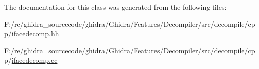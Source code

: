 The documentation for this class was generated from the following files\+:\begin{DoxyCompactItemize}
\item 
F\+:/re/ghidra\+\_\+sourcecode/ghidra/\+Ghidra/\+Features/\+Decompiler/src/decompile/cpp/\mbox{\hyperlink{ifacedecomp_8hh}{ifacedecomp.\+hh}}\item 
F\+:/re/ghidra\+\_\+sourcecode/ghidra/\+Ghidra/\+Features/\+Decompiler/src/decompile/cpp/\mbox{\hyperlink{ifacedecomp_8cc}{ifacedecomp.\+cc}}\end{DoxyCompactItemize}
